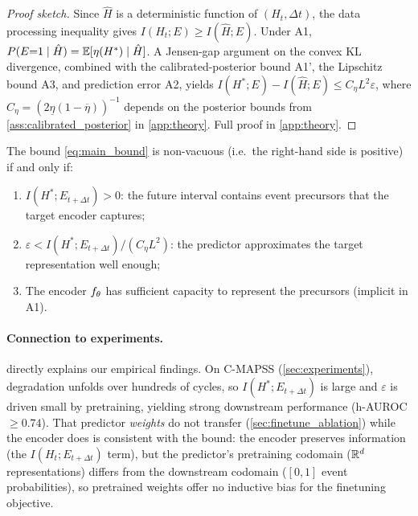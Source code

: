 \begin{proof}[Proof sketch]
Since $\hat{H}$ is a deterministic function of $(H_t, \Delta t)$, the data processing inequality gives $I(H_t; E) \geq I(\hat{H}; E)$.
Under A1, $P(E{=}1 \mid \hat{H}) = \mathbb{E}[\eta(H^*) \mid \hat{H}]$.
A Jensen-gap argument on the convex KL divergence, combined with the calibrated-posterior bound A1', the Lipschitz bound A3, and prediction error A2, yields $I(H^*; E) - I(\hat{H}; E) \leq C_\eta L^2 \varepsilon$, where $C_\eta = (2\underline{\eta}(1-\overline{\eta}))^{-1}$ depends on the posterior bounds from \ref{ass:calibrated_posterior} in \cref{app:theory}.
Full proof in \cref{app:theory}.
\end{proof}

\begin{corollary}
\label{cor:precursor}
The bound \eqref{eq:main_bound} is non-vacuous (i.e.\ the right-hand side is positive) if and only if:
\begin{enumerate}[nosep,label=(\roman*)]
  \item $I(H^*; E_{t+\Delta t}) > 0$: the future interval contains event precursors that the target encoder captures;
  \item $\varepsilon < I(H^*; E_{t+\Delta t}) / (C_\eta L^2)$: the predictor approximates the target representation well enough;
  \item The encoder $f_\theta$ has sufficient capacity to represent the precursors (implicit in A1).
\end{enumerate}
\end{corollary}

\paragraph{Connection to experiments.}
 directly explains our empirical findings.
On C-MAPSS (\cref{sec:experiments}), degradation unfolds over hundreds of cycles, so $I(H^*; E_{t+\Delta t})$ is large and $\varepsilon$ is driven small by pretraining, yielding strong downstream performance (h-AUROC $\geq 0.74$).
That predictor \emph{weights} do not transfer (\cref{sec:finetune_ablation}) while the encoder does is consistent with the bound: the encoder preserves information (the $I(H_t; E_{t+\Delta t})$ term), but the predictor's pretraining codomain ($\mathbb{R}^d$ representations) differs from the downstream codomain ($[0,1]$ event probabilities), so pretrained weights offer no inductive bias for the finetuning objective.

